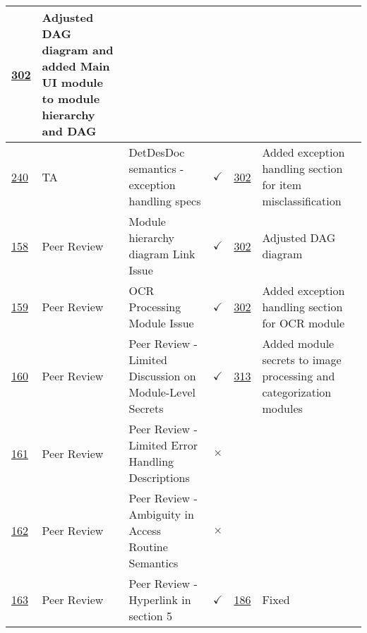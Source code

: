 \documentclass{article}
\begin{document}
\begin{table}[H]
{\begin{tabular}{p{1.5cm} p{2cm} p{3.5cm} c c p{4cm}}
        \href{https://github.com/PlutosCapstone/Plutos/pull/302}{302} &  Adjusted
        DAG diagram and added Main UI module to module hierarchy and DAG \\ \hline
        \href{https://github.com/PlutosCapstone/Plutos/issues/240}{240} & TA  &
        DetDesDoc semantics - exception handling specs & $\checkmark$ &
        \href{https://github.com/PlutosCapstone/Plutos/pull/302}{302} &  Added
        exception handling section for item misclassification \\ \hline
        \href{https://github.com/PlutosCapstone/Plutos/issues/158}{158} & Peer Review &
        Module hierarchy diagram Link Issue & $\checkmark$ &
        \href{https://github.com/PlutosCapstone/Plutos/pull/302}{302} &  Adjusted
        DAG diagram \\ \hline
        \href{https://github.com/PlutosCapstone/Plutos/issues/159}{159} & Peer Review &
        OCR Processing Module Issue & $\checkmark$ &
        \href{https://github.com/PlutosCapstone/Plutos/pull/302}{302} &  Added
        exception handling section for OCR module \\ \hline
        \href{https://github.com/PlutosCapstone/Plutos/issues/160}{160} & Peer
        Review & Peer Review - Limited Discussion on Module-Level Secrets &
        $\checkmark$ &
        \href{https://github.com/PlutosCapstone/Plutos/pull/313}{313} & Added
        module secrets to image processing and categorization modules  \\ \hline
        \href{https://github.com/PlutosCapstone/Plutos/issues/161}{161} & Peer
        Review & Peer Review - Limited Error Handling Descriptions & $\times$ &
        &   \\ \hline
        \href{https://github.com/PlutosCapstone/Plutos/issues/162}{162} & Peer
        Review & Peer Review - Ambiguity in Access Routine Semantics  & $\times$
        & &   \\ \hline
        \href{https://github.com/PlutosCapstone/Plutos/issues/163}{163} & Peer
        Review & Peer Review - Hyperlink in section 5 & $\checkmark$ &
        \href{https://github.com/PlutosCapstone/Plutos/pull/186}{186} & Fixed
        \\
    \bottomrule
    \end{tabular}%
    }
\end{table}
\end{document}
